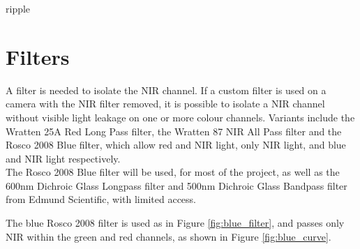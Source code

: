 ripple

\section{Filters}

A filter is needed to isolate the NIR channel. If a custom filter is used on a camera with the NIR filter removed, it is possible to isolate a NIR channel without visible light leakage on one or more colour channels. Variants include the Wratten 25A Red Long Pass filter, the Wratten 87 NIR All Pass filter and the Rosco 2008 Blue filter, which allow red and NIR light, only NIR light, and blue and NIR light respectively.\\

The Rosco 2008 Blue filter will be used, for most of the project, as well as the 600nm Dichroic Glass Longpass filter and 500nm Dichroic Glass Bandpass filter from Edmund Scientific, with limited access.

The blue Rosco 2008 filter is used as in Figure \ref{fig:blue_filter}, and passes only NIR within the green and red channels, as shown in Figure \ref{fig:blue_curve}.

